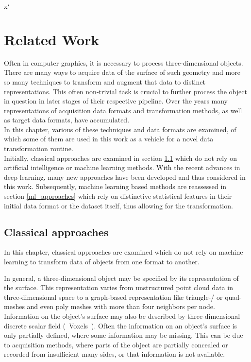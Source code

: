 x`\chapter{Related Work}
\label{sec:relatedwork}
Often in computer graphics, it is necessary to process three-dimensional objects. There are many ways to acquire data of the surface of such geometry and more so many techniques to transform and augment that data to distinct representations. This often non-trivial task is crucial to further process the object in question in later stages of their respective pipeline. Over the years many representations of acquisition data formats and transformation methods, as well as target data formats, have accumulated.\\
In this chapter, various of these techniques and data formats are examined, of which some of them are used in this work as a vehicle for a novel data transformation routine.\\
Initially, classical approaches are examined in section \ref{classic_approaches} which do not rely on artificial intelligence or machine learning methods.
With the recent advances in deep learning, many new approaches have been developed and thus considered in this work.
Subsequently, machine learning based methods are reassessed in section \ref{ml_approaches} which rely on distinctive statistical features in their initial data format or the dataset itself, thus allowing for the transformation.
\section{Classical approaches}
\label{classic_approaches}
In this chapter, classical approaches are examined which do not rely on machine
 learning to transform data of objects from one format to another. 

In general, a three-dimensional object may be specified by its representation of the
 surface. This representation varies from unstructured point cloud data in three-dimensional space
  to a graph-based representation like triangle-/ or quad-meshes and even poly meshes
   with more than four neighbors per node. Information on the object's surface may also be described
    by three-dimensional discrete scalar field (~Voxels~).  Often the information on an object's
     surface is only partially defined, where some information may be missing. 
     This can be due to acquisition methods, where parts of the object are partially 
     concealed or recorded from insufficient many sides, or that information is not available.


